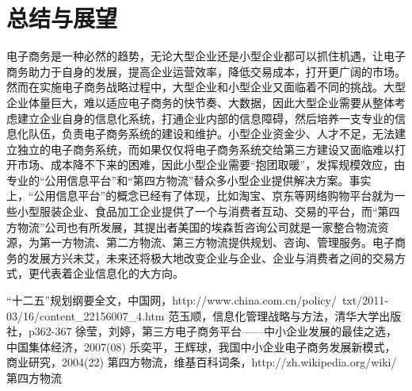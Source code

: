 \documentclass[UTF8]{ctexart}
\begin{document}
\section{总结与展望}
电子商务是一种必然的趋势，无论大型企业还是小型企业都可以抓住机遇，让电子商务助力于自身的发展，提高企业运营效率，降低交易成本，打开更广阔的市场。然而在实施电子商务战略过程中，大型企业和小型企业又面临着不同的挑战。大型企业体量巨大，难以适应电子商务的快节奏、大数据，因此大型企业需要从整体考虑建立企业自身的信息化系统，打通企业内部的信息障碍，然后培养一支专业的信息化队伍，负责电子商务系统的建设和维护。小型企业资金少、人才不足，无法建立独立的电子商务系统，而如果仅仅将电子商务系统交给第三方建设又面临难以打开市场、成本降不下来的困难，因此小型企业需要“抱团取暖”，发挥规模效应，由专业的“公用信息平台”和“第四方物流”替众多小型企业提供解决方案。事实上，“公用信息平台”的概念已经有了体现，比如淘宝、京东等网络购物平台就为一些小型服装企业、食品加工企业提供了一个与消费者互动、交易的平台，而“第四方物流”公司也有所发展，其提出者美国的埃森哲咨询公司就是一家整合物流资源，为第一方物流、第二方物流、第三方物流提供规划、咨询、管理服务。\cite{Wiki}电子商务的发展方兴未艾，未来还将极大地改变企业与企业、企业与消费者之间的交易方式，更代表着企业信息化的大方向。

\begin{thebibliography}{}
“十二五”规划纲要全文，中国网，http://www.china.com.cn/policy/\
txt/2011-03/16/content\_22156007\_4.htm
范玉顺，信息化管理战略与方法，清华大学出版社，p362-367
徐莹，刘婷，第三方电子商务平台——中小企业发展的最佳之选，中国集体经济，2007(08)
乐奕平，王辉球，我国中小企业电子商务发展新模式，商业研究，2004(22)
第四方物流，维基百科词条，http://zh.wikipedia.org/wiki/第四方物流
\end{thebibliography}
\end{document}
